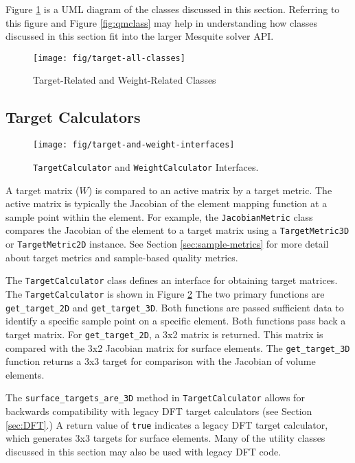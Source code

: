 \documentclass{article}
\begin{document}
Figure \ref{fig:target-all-classes} is a UML diagram of the classes discussed in this section.  Referring to this figure and Figure \ref{fig:qmclass} may help in understanding how classes discussed in this section fit into the larger Mesquite solver API.

\begin{figure}[ptb]
\begin{center}
\texttt{[image: fig/target-all-classes]}
\caption{Target-Related and Weight-Related Classes\label{fig:target-all-classes}}
\end{center}
\end{figure}

\subsection{Target Calculators}

\begin{figure}[htb]
\begin{center}
\texttt{[image: fig/target-and-weight-interfaces]}
\caption{\texttt{TargetCalculator} and \texttt{WeightCalculator} Interfaces.\label{fig:target-iface}}
\end{center}
\end{figure}

A target matrix ($W$) is compared to an active matrix by a target metric.  The active matrix is typically the Jacobian of the element mapping function at a sample point within the element.  For example, the \texttt{JacobianMetric} class compares the Jacobian of the element to a target matrix using a \texttt{TargetMetric3D} or \texttt{TargetMetric2D} instance.  See Section \ref{sec:sample-metrics} for more detail about target metrics and sample-based quality metrics.

The \texttt{TargetCalculator} class defines an interface for obtaining target matrices.  The \texttt{TargetCalculator} is shown in Figure \ref{fig:target-iface} The two primary functions are \texttt{get\_target\_2D} and \texttt{get\_target\_3D}.  Both functions are passed sufficient data to identify a specific sample point on a specific element.  Both functions pass back a target matrix.  For \texttt{get\_target\_2D}, a 3x2 matrix is returned.  This matrix is compared with the 3x2 Jacobian matrix for surface elements.  The \texttt{get\_target\_3D} function returns a 3x3 target for comparison with the Jacobian of volume elements.

The \texttt{surface\_targets\_are\_3D} method in \texttt{TargetCalculator} allows for backwards compatibility with legacy DFT target calculators (see Section \ref{sec:DFT}.)  A return value of \texttt{true} indicates a legacy DFT target calculator, which generates 3x3 targets for surface elements.  Many of the utility classes discussed in this section may also be used with legacy DFT code.
\end{document}
